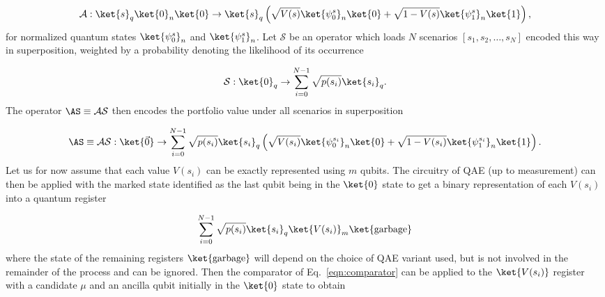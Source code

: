 \begin{enumerate}
\begin{equation}
	\label{eqn:A_operator_scenario}
    \mathcal{A} : \ket{s}_q\ket{0}_n\ket{0} \rightarrow \ket{s}_q\left(\sqrt{V(s)}\ket{\psi_0^s}_n\ket{0} + \sqrt{1-V(s)}\ket{\psi_1^s}_n\ket{1} \right),
\end{equation}
for normalized quantum states $\ket{\psi_0^s}_n$ and $\ket{\psi_1^s}_n$.
Let $\mathcal{S}$ be an operator which loads $N$ scenarios $[ s_1, s_2, \dots, s_N]$ encoded this way in superposition, weighted by a probability denoting the likelihood of its occurrence

\begin{equation}
	\label{eqn:S_operator}
	\mathcal{S}: \ket{0}_q \rightarrow \sum_{i=0}^{N-1}\sqrt{p(s_i)}\ket{s_i}_q.
\end{equation}
The operator $\AS \equiv \mathcal{A}\mathcal{S}$ then encodes the portfolio value under all scenarios in superposition

\begin{equation}
	\label{eqn:AS_operator}
	\AS \equiv \mathcal{A}\mathcal{S}: \ket{\vec{0}} \rightarrow \sum_{i=0}^{N-1}\sqrt{p(s_i)}\ket{s_i}_q \left(\sqrt{V(s_i)}\ket{\psi_0^{s_i}}_n\ket{0} + \sqrt{1-V(s_i)}\ket{\psi_1^{s_i}}_n\ket{1} \right).
\end{equation}
Let us for now assume that each value $V(s_i)$ can be exactly represented using $m$ qubits.
The circuitry of QAE (up to measurement) can then be applied with the marked state identified as the last qubit being in the $\ket{0}$ state to get a binary representation of each $V(s_i)$ into a quantum register

\begin{equation}
	\label{eqn:inner_qae}
	\sum_{i=0}^{N-1}\sqrt{p(s_i)}\ket{s_i}_q\ket{V(s_i)}_m \ket{\textrm{garbage}}
\end{equation}
where the state of the remaining registers $\ket{\textrm{garbage}}$ will depend on the choice of QAE variant used, but is not involved in the remainder of the process and can be ignored.
Then the comparator of Eq.~\eqref{eqn:comparator} can be applied to the $\ket{V(s_i)}$ register with a \var{} candidate $\mu$ and an ancilla qubit initially in the $\ket{0}$ state to obtain


\end{enumerate}
